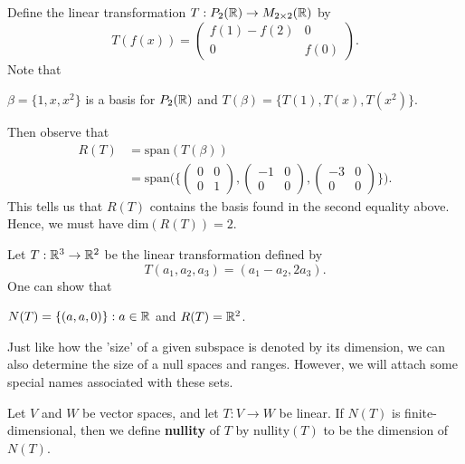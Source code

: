 \begin{eg}
    Define the linear transformation \( T: P_{2}(\mathbb{R}) \to M_{2 \times 2}(\mathbb{R}) \) by 
    \[  T(f(x)) = \begin{pmatrix}
        f(1) - f(2) & 0 \\
        0 & f(0)
    \end{pmatrix}. \]
    Note that 
    \begin{center}
        \( \beta = \{ 1,x, x^{2} \}  \) is a basis for \( P_{2}(\mathbb{R})  \) and \( T(\beta) = \{ T(1), T(x), T(x^{2}) \}. \)
    \end{center}
    Then observe that
    \begin{align*}
        R(T) &= \text{span}(T(\beta)) \\
             &= \text{span}\Big( \Big\{ \begin{pmatrix}
                         0 & 0 \\
                         0 & 1 
             \end{pmatrix}, \begin{pmatrix}
                         -1 & 0 \\
                         0 & 0 
             \end{pmatrix}, \begin{pmatrix}
                         -3 & 0 \\ 
                         0 & 0 
             \end{pmatrix} \Big\}  \Big).
    \end{align*}
    This tells us that \( R(T) \) contains the basis found in the second equality above. Hence, we must have \( \text{dim}(R(T)) = 2  \). 
\end{eg}

\begin{eg}\label{Example 9}
    Let \( T: \mathbb{R}^{3} \to \mathbb{R}^{2}  \) be the linear transformation defined by 
    \[  T(a_{1}, a_{2}, a_{3}) = (a_{1} - a_{2}, 2a_{3}). \]
    One can show that 
    \begin{center}
        \( N(T) = \{ (a, a, 0) \}: a \in \mathbb{R}   \) and \( R(T) = \mathbb{R}^{2} \).
    \end{center}
\end{eg}



Just like how the 'size' of a given subspace is denoted by its dimension, we can also determine the size of a null spaces and ranges. However, we will attach some special names associated with these sets.
\begin{definition}[Nullity]\label{Nullity}
    Let \( V  \) and \( W  \) be vector spaces, and let \( T: V \to W  \) be linear. If \( N(T)  \) is finite-dimensional, then we define \textbf{nullity} of \( T  \) by \( \text{nullity}(T)  \) to be the dimension of \( N(T) \).
\end{definition}


